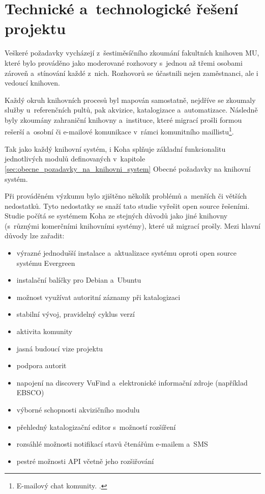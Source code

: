 \documentclass[
	11pt, oneside, printed, final, palatino, monochrome
	microtype,
	table,   %
	lof,     %
	lot     %
]{fithesis3}
\begin{document}
{\section{Technické a~technologické řešení projektu}

Veškeré požadavky vycházejí z~šestiměsíčního zkoumání fakultních knihoven MU, které bylo prováděno jako moderované rozhovory s~jednou až třemi osobami zároveň a~stínování každé z~nich. Rozhovorů se účastnili nejen zaměstnanci, ale i vedoucí knihoven. 

Každý okruh knihovních procesů byl mapován samostatně, nejdříve se zkoumaly služby u~referenčních pultů, pak akvizice, katalogizace a~automatizace. Následně byly zkoumány zahraniční knihovny a~instituce, které migrací prošli formou rešerší a~osobní či e-mailové komunikace v~rámci komunitního maillistu\footnote{E-mailový chat komunity.
.}. 

Tak jako každý knihovní systém, i Koha splňuje základní funkcionalitu jednotlivých modulů definovaných v~kapitole \ref{sec:obecne_pozadavky_na_knihovni_system} Obecné požadavky na knihovní systém.

Při prováděném výzkumu bylo zjištěno několik problémů a~menších či větších nedostatků. Tyto nedostatky se snaží tato studie vyřešit open source řešeními. Studie počítá se systémem Koha ze stejných důvodů jako jiné knihovny (s~různými komerčními knihovními systémy), které už migrací prošly. Mezi hlavní důvody lze zařadit: 

\begin{itemize}
\item výrazné jednodušší instalace a~aktualizace systému oproti open source systému Evergreen
\item instalační balíčky pro Debian a~Ubuntu
\item možnost využívat autoritní záznamy při katalogizaci
\item stabilní vývoj, pravidelný cyklus verzí
\item aktivita komunity
\item jasná budoucí vize projektu
\item podpora autorit
\item napojení na discovery VuFind a~elektronické informační zdroje (například EBSCO)
\item výborné schopnosti akvizičního modulu
\item přehledný katalogizační editor s~možností rozšíření
\item rozsáhlé možnosti notifikací stavů čtenářům e-mailem a~SMS
\item pestré možnosti API včetně jeho rozšiřování
\end{itemize}

}
\end{document}
